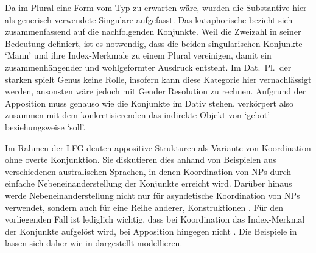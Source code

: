 Da im Plural eine Form vom Typ  zu erwarten wäre, wurden die
Substantive hier als generisch verwendete Singulare aufgefasst. Das
kataphorische  bezieht sich zusammenfassend auf die nachfolgenden
Konjunkte. Weil  die Zweizahl in seiner Bedeutung definiert, ist es
notwendig, dass die beiden singularischen Konjunkte  `Mann' und
 ihre Index-Merkmale zu einem Plural vereinigen, damit ein
zusammenhängender und wohlgeformter Ausdruck entsteht. Im Dat.~Pl.\ der starken
 spielt Genus keine Rolle, insofern kann diese
Kategorie hier vernachlässigt werden, ansonsten wäre jedoch mit Gender
Resolution zu rechnen. Aufgrund der Apposition muss 
genauso wie die Konjunkte im Dativ stehen.  verkörpert also
zusammen mit dem konkretisierenden  das indirekte Objekt von
 `gebot' beziehungsweise  `soll'.

Im Rahmen der LFG deuten \citet{sadlernordlinger2006} appositive
Strukturen als Variante von Koordination ohne overte Konjunktion. Sie
diskutieren dies anhand von Beispielen aus verschiedenen australischen
Sprachen, in denen Koordination von NPs durch einfache Nebeneinanderstellung
der Konjunkte erreicht wird. Darüber hinaus werde Nebeneinanderstellung nicht
nur für asyndetische Koordination von NPs verwendet, sondern auch für eine
Reihe anderer,  Konstruktionen
\autocite[440--441]{sadlernordlinger2006}. Für den vorliegenden Fall ist
lediglich wichtig, dass bei Koordination das Index-Merkmal der Konjunkte
aufgelöst wird, bei Apposition hingegen nicht
\autocite[444]{sadlernordlinger2006}. Die Beispiele in
 lassen sich daher wie in
 dargestellt modellieren.

